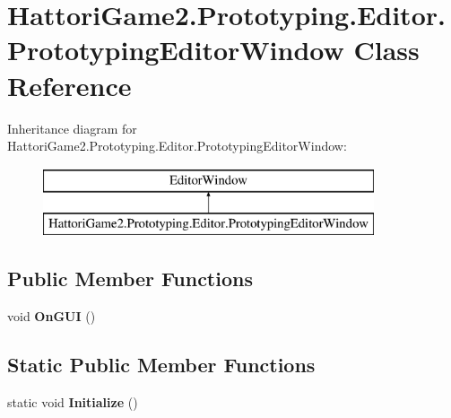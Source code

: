 \hypertarget{class_hattori_game2_1_1_prototyping_1_1_editor_1_1_prototyping_editor_window}{}\section{Hattori\+Game2.\+Prototyping.\+Editor.\+Prototyping\+Editor\+Window Class Reference}
\label{class_hattori_game2_1_1_prototyping_1_1_editor_1_1_prototyping_editor_window}
Inheritance diagram for Hattori\+Game2.\+Prototyping.\+Editor.\+Prototyping\+Editor\+Window\+:\begin{figure}[H]
\begin{center}
\leavevmode
\includegraphics[height=2.000000cm]{class_hattori_game2_1_1_prototyping_1_1_editor_1_1_prototyping_editor_window}
\end{center}
\end{figure}
\subsection*{Public Member Functions}
\begin{DoxyCompactItemize}
\item 
\hypertarget{class_hattori_game2_1_1_prototyping_1_1_editor_1_1_prototyping_editor_window_a9e415322ce866f231efc95b00546c14e}{}void {\bfseries On\+G\+U\+I} ()\label{class_hattori_game2_1_1_prototyping_1_1_editor_1_1_prototyping_editor_window_a9e415322ce866f231efc95b00546c14e}

\end{DoxyCompactItemize}
\subsection*{Static Public Member Functions}
\begin{DoxyCompactItemize}
\item 
\hypertarget{class_hattori_game2_1_1_prototyping_1_1_editor_1_1_prototyping_editor_window_acf153beb184f57151805a359a355cab7}{}static void {\bfseries Initialize} ()\label{class_hattori_game2_1_1_prototyping_1_1_editor_1_1_prototyping_editor_window_acf153beb184f57151805a359a355cab7}

\end{DoxyCompactItemize}
